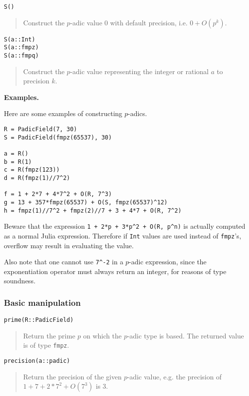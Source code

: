 \documentclass[a4paper,10pt]{article}
\newcommand{\code}{\lstinline}
\newcommand{\desc}[1]{\vspace{-3mm}\begin{quote}#1\end{quote}}
\begin{document}
{{\begin{lstlisting}
S()
\end{lstlisting}

\desc{Construct the $p$-adic value $0$ with default precision, i.e. $0 + O(p^k)$.}

\begin{lstlisting}
S(a::Int)
S(a::fmpz)
S(a::fmpq)
\end{lstlisting}

\desc{Construct the $p$-adic value representing the integer or rational $a$ to
precision $k$.}

\textbf{Examples.}

Here are some examples of constructing $p$-adics.

\begin{lstlisting}
R = PadicField(7, 30)
S = PadicField(fmpz(65537), 30)

a = R()
b = R(1)
c = R(fmpz(123))
d = R(fmpz(1)//7^2)

f = 1 + 2*7 + 4*7^2 + O(R, 7^3)
g = 13 + 357*fmpz(65537) + O(S, fmpz(65537)^12)
h = fmpz(1)//7^2 + fmpz(2)//7 + 3 + 4*7 + O(R, 7^2)
\end{lstlisting}

Beware that the expression \code{1 + 2*p + 3*p^2 + O(R, p^n)} is actually computed as
a normal Julia expression. Therefore if \code{Int} values are used instead of
\code{fmpz}'s, overflow may result in evaluating the value.

Also note that one cannot use \code{7^-2} in a $p$-adic expression, since the 
exponentiation operator must always return an integer, for reasons of type soundness.

\subsubsection{Basic manipulation}

\begin{lstlisting}
prime(R::PadicField)
\end{lstlisting}

\desc{Return the prime $p$ on which the $p$-adic type is based. The returned
value is of type \code{fmpz}.}

\begin{lstlisting}
precision(a::padic)
\end{lstlisting}

\desc{Return the precision of the given $p$-adic value, e.g. the precision of
$1 + 7 + 2*7^2 + O(7^3)$ is $3$.}

}}
\end{document}
